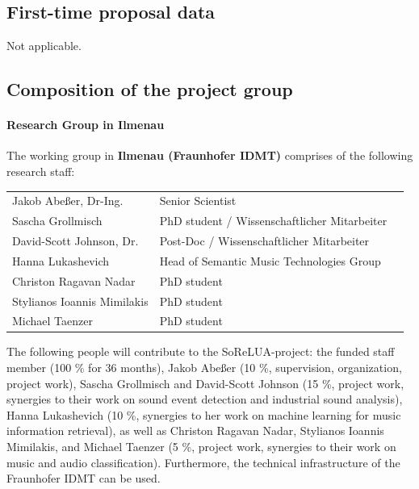 \documentclass[11pt]{article}
\begin{document}
\subsection{First-time proposal data}
Not applicable.

\subsection{Composition of the project group}

\paragraph{Research Group in Ilmenau}
The working group in \textbf{Ilmenau (Fraunhofer IDMT)} comprises of the following research staff:

\begin{table}[h!]
\begin{tabular}{lll}
 Jakob Abeßer, Dr-Ing. & Senior Scientist   \\
 Sascha Grollmisch & PhD student / Wissenschaftlicher Mitarbeiter \\
 David-Scott Johnson, Dr. & Post-Doc / Wissenschaftlicher Mitarbeiter \\
Hanna Lukashevich & Head of Semantic Music Technologies Group \\
Christon Ragavan Nadar & PhD student \\
Stylianos Ioannis Mimilakis  & PhD student \\
Michael Taenzer  & PhD student \\
\end{tabular}
\end{table}

The following people will contribute to the SoReLUA-project: the funded staff member (100 \% for 36 months), Jakob Abeßer (10 \%, supervision, organization, project work), Sascha Grollmisch and David-Scott Johnson (15 \%, project work, synergies to their work on sound event detection and industrial sound analysis), Hanna Lukashevich (10 \%, synergies to her work on machine learning for music information retrieval), as well as Christon Ragavan Nadar, Stylianos Ioannis Mimilakis, and Michael Taenzer (5 \%, project work, synergies to their work on music and audio classification). Furthermore, the technical infrastructure of the Fraunhofer IDMT can be used.
\end{document}
